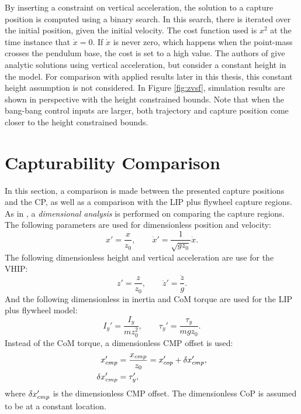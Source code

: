 By inserting a constraint on vertical acceleration, the solution to a capture position is computed using a binary search. In this search, there is iterated over the initial position, given the initial velocity. The cost function used is $x^2$ at the time instance that $\dot{x}=0$.  If $\dot{x}$ is never zero, which happens when the point-mass crosses the pendulum base, the cost is set to a high value. The authors of \cite{gao2017increase} give analytic solutions using vertical acceleration, but consider a constant height in the model. For comparison with applied results later in this thesis, this constant height assumption is not considered. In Figure \ref{fig:zvsf}, simulation results are shown in perspective with the height constrained bounds. Note that when the bang-bang control inputs are larger, both trajectory and capture position come closer to the height constrained bounds.

\section{Capturability Comparison}
In this section, a comparison is made between the presented capture positions and the \ac{CP}, as well as a comparison with the \ac{LIP} plus flywheel capture regions. As in \cite{pratt2006capture, stephens2007humanoid, koolen2012capturability}, a \textit{dimensional analysis} is performed on comparing the capture regions. The following parameters are used for dimensionless position and velocity:
\begin{equation}
	x' = \frac{x}{z_0}, \qquad \dot{x}' = \frac{1}{\sqrt{gz_0}}\dot{x}.
\end{equation}
The following dimensionless height and vertical acceleration are use for the \ac{VHIP}:
\begin{equation}
 z' = \frac{z}{z_0}, \qquad \ddot{z}'=\frac{\ddot{z}}{g}.
\end{equation}
And the following dimensionless in inertia and \ac{CoM} torque are used for the \ac{LIP} plus flywheel model:
\begin{equation}
I_y'=\frac{I_y}{mz_0^2}, \qquad \tau_y' = \frac{\tau_y}{mgz_0}.
\end{equation}
Instead of the \ac{CoM} torque, a dimensionless \ac{CMP} offset is used:
\begin{align}
	x_{cmp}' &=\frac{x_{cmp}}{z_0}=x_{cop}' + \delta x_{cmp}',\\
	\delta x_{cmp}' &=\tau_y',
\end{align}
where $\delta x_{cmp}'$ is the dimensionless \ac{CMP} offset. The dimensionless \ac{CoP} is assumed to be at a constant location.

